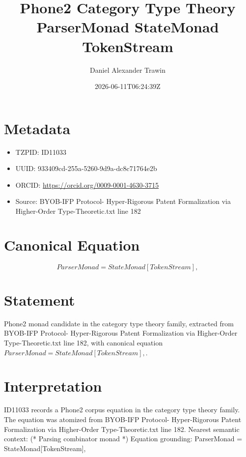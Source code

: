 \documentclass[11pt]{article}
\title{Phone2 Category Type Theory ParserMonad StateMonad TokenStream}
\author{Daniel Alexander Trawin}
\date{2026-06-11T06:24:39Z}
\begin{document}
\maketitle
\section*{Metadata}
\begin{itemize}
\item TZPID: ID11033
\item UUID: 933409cd-255a-5260-9d9a-dc8c71764e2b
\item ORCID: \url{https://orcid.org/0009-0001-4630-3715}
\item Source: BYOB-IFP Protocol- Hyper-Rigorous Patent Formalization via Higher-Order Type-Theoretic.txt line 182
\end{itemize}
\section*{Canonical Equation}
\[
ParserMonad = StateMonad[TokenStream],
\]
\section*{Statement}
Phone2 monad candidate in the category type theory family, extracted from BYOB-IFP Protocol- Hyper-Rigorous Patent Formalization via Higher-Order Type-Theoretic.txt line 182, with canonical equation $ParserMonad = StateMonad[TokenStream],$.
\section*{Interpretation}
ID11033 records a Phone2 corpus equation in the category type theory family. The equation was atomized from BYOB-IFP Protocol- Hyper-Rigorous Patent Formalization via Higher-Order Type-Theoretic.txt line 182. Nearest semantic context: (* Parsing combinator monad *) Equation grounding: ParserMonad = StateMonad[TokenStream],
\end{document}
